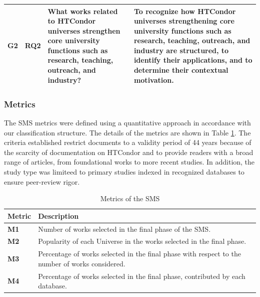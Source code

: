 \begin{table}[htbp]
\begin{tabular}{p{1cm}p{1.7cm}p{6.8cm}p{6.8cm}}
		G2                 & RQ2                        & What works related to HTCondor universes strengthen core university functions such as research, teaching, outreach, and industry?                                                                                                                                                                             & To recognize how HTCondor universes strengthening core university functions such as research, teaching, outreach, and industry are structured, to identify their applications, and to determine their contextual motivation.                                                                                                                                                    \\
		\bottomrule
	\end{tabular}
\end{table}

\subsubsection{Metrics}
The SMS metrics were defined using a quantitative approach in accordance with our classification structure. The details of the metrics are shown in Table \ref{table:Metrics}. The criteria established restrict documents to a validity period of 44 years because of the scarcity of documentation on HTCondor and to provide readers with a broad range of articles, from foundational works to more recent studies. In addition, the study type was limiteed to primary studies indexed in recognized databases to ensure peer-review rigor.

\begin{table}[htbp]
	\centering
	\caption{Metrics of the SMS}
	\label{table:Metrics}
	\renewcommand{\arraystretch}{1}  %
	\begin{tabular}{p{1cm}p{6.8cm}}
		\toprule
		\textbf{Metric} & \textbf{Description}                                                                            \\
		\midrule
		\textbf{M1}     & Number of works selected in the final phase of the SMS.                                         \\
		\addlinespace[0.8em]
		\textbf{M2}     & Popularity of each Universe in the works selected in the final phase.                           \\
		\addlinespace[0.8em]
		\textbf{M3}     & Percentage of works selected in the final phase with respect to the number of works considered. \\
		\addlinespace[0.8em]
		\textbf{M4}     & Percentage of works selected in the final phase, contributed by each database.                  \\
		\bottomrule
	\end{tabular}
\end{table}


